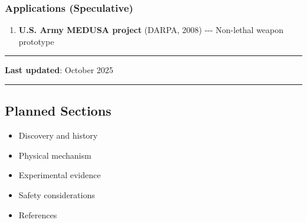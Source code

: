 \subsubsection{Applications
(Speculative)}\label{applications-speculative}

\begin{enumerate}
\def\labelenumi{\arabic{enumi}.}
\setcounter{enumi}{7}
\tightlist
\item
  \textbf{U.S. Army MEDUSA project} (DARPA, 2008) -\/-\/- Non-lethal
  weapon prototype
\end{enumerate}

\begin{center}\rule{0.5\linewidth}{0.5pt}\end{center}

\textbf{Last updated}: October 2025

\begin{center}\rule{0.5\linewidth}{0.5pt}\end{center}

\subsection{Planned Sections}\label{planned-sections}

\begin{itemize}
\tightlist
\item
  Discovery and history
\item
  Physical mechanism
\item
  Experimental evidence
\item
  Safety considerations
\item
  References
\end{itemize}
